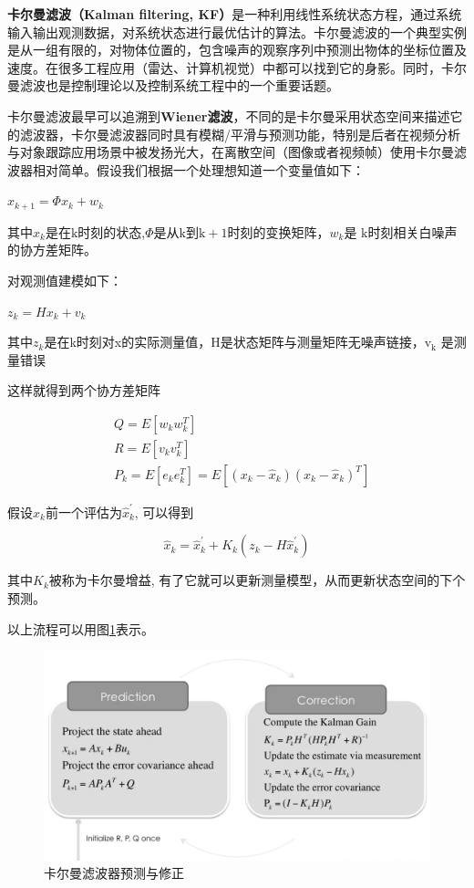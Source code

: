 \textbf{卡尔曼滤波（Kalman filtering, KF）}是一种利用线性系统状态方程，通过系统输入输出观测数据，对系统状态进行最优估计的算法\cite{ArtE3}。卡尔曼滤波的一个典型实例是从一组有限的，对物体位置的，包含噪声的观察序列中预测出物体的坐标位置及速度。在很多工程应用（雷达、计算机视觉）中都可以找到它的身影。同时，卡尔曼滤波也是控制理论以及控制系统工程中的一个重要话题。

卡尔曼滤波最早可以追溯到\textbf{Wiener滤波}，不同的是卡尔曼采用状态空间来描述它的滤波器，卡尔曼滤波器同时具有模糊/平滑与预测功能，特别是后者在视频分析与对象跟踪应用场景中被发扬光大，在离散空间（图像或者视频帧）使用卡尔曼滤波器相对简单。假设我们根据一个处理想知道一个变量值如下：

$x_{k+1}=\Phi x_{k}+w_{k}$

其中$x_{k}$是在$\mathrm{k}$时刻的状态,$\Phi$是从$\mathrm{k}$到$\mathrm{k}+1$时刻的变换矩阵，$w_{k}$是 $\mathrm{k}$时刻相关白噪声的协方差矩阵。

对观测值建模如下：

$z_{k}=H x_{k}+v_{k}$

其中$z_{k}$是在k时刻对x的实际测量值，$\mathrm{H}$是状态矩阵与测量矩阵无噪声链接，$\mathrm{v}_{\mathrm{k}}$ 是测量错误

这样就得到两个协方差矩阵

$$
\begin{aligned}
&Q=E\left[w_{k} w_{k}^{T}\right] \\
&R=E\left[v_{k} v_{k}^{T}\right] \\
&P_{k}=E\left[e_{k} e_{k}^{T}\right]=E\left[\left(x_{k}-\hat{x}_{k}\right)\left(x_{k}-\hat{x}_{k}\right)^{T}\right]
\end{aligned}
$$

假设$\hat{x}_{k}$前一个评估为$\hat{x}_{k}^{\prime}$, 可以得到

$$
\hat{x}_{k}=\hat{x}_{k}^{\prime}+K_{k}\left(z_{k}-H \hat{x}_{k}^{\prime}\right)
$$

其中$K_{k}$被称为卡尔曼增益, 有了它就可以更新测量模型，从而更新状态空间的下个预测。

以上流程可以用图\ref{Fig:img3}表示。

\begin{figure}[ht]
  \centering
  \includegraphics[width=0.8\linewidth]{./Figure/Kalman_Prediction_and_Correction.png}
  \caption{卡尔曼滤波器预测与修正}\label{Fig:img3}
\end{figure}

